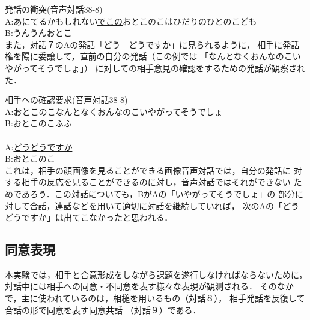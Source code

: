 \hspace*{-0.5cm}{\bf 対話６}\hspace{0.33cm}発話の衝突(音声対話38-8)\\
A:あにてるかもしれない\hspace{1.9cm}\underline{でこの}おとこのこはひだりのひとのこども\\
B:\hspace{3.4cm}うんうん\hspace{0.6cm}\underline{おとこ}\\

また，対話７のAの発話「どう　どうですか」に見られるように，
相手に発話権を陽に委譲して，直前の自分の発話（この例では
「なんとなくおんなのこいやがってそうでしょ」）
に対しての相手意見の確認をするための発話が観察された．

\hspace*{-0.5cm}{\bf 対話７}\hspace{0.33cm}相手への確認要求(音声対話38-8)\\
A:おとこのこ\hspace{1.9cm}なんとなくおんなのこいやがってそうでしょ\\
B:\hspace{1.6cm}おとこのこ\hspace{6.8cm}ふふ\\
\vspace{-0.3cm}\\
A:\underline{どう\hspace{0.3cm}どうですか}\\
B:\hspace{2.9cm}おとこのこ\\

これは，相手の顔画像を見ることができる画像音声対話では，自分の発話に
対する相手の反応を見ることができるのに対し，音声対話ではそれができない
ためであろう．この対話についても，BがAの「いやがってそうでしょ」の
部分に対して合話，連話などを用いて適切に対話を継続していれば，
次のAの「どう どうですか」は出てこなかったと思われる．

\subsection{同意表現}

本実験では，相手と合意形成をしながら課題を遂行しなければならないために，
対話中には相手への同意・不同意を表す様々な表現が観測される．
そのなかで，主に使われているのは，相槌を用いるもの（対話８），
相手発話を反復して合話の形で同意を表す同意共話\cite{YanoAndIto1997}
（対話９）である．


